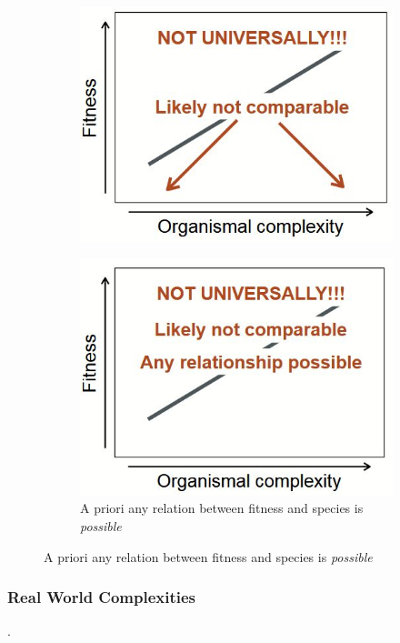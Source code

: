 \documentclass[]{article}
\begin{document}
\begin{figure}[H]
\begin{subfigure}[t]{0.45\textwidth}
		\includegraphics[width=\textwidth]{FitComplex3}
	\end{subfigure}
	\begin{subfigure}[t]{0.45\textwidth}
		\caption{ A priori any relation between fitness and species is \emph{possible}}\label{fig:FitComplex4}
		\includegraphics[width=\textwidth]{FitComplex4}
	\end{subfigure}
\end{figure}


\subsubsection{Real World Complexities}.
\end{document}

